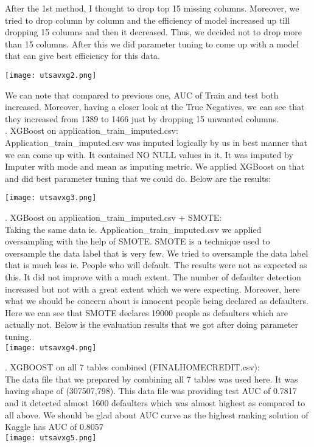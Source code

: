 \documentclass[fleqn,10pt]{SelfArx} %
\begin{document}
\begin{itemize}
\noindent
After the 1st method, I thought to drop top 15 missing columns. Moreover, we tried to drop column by column and the efficiency of model increased up till dropping 15 columns and then it decreased. Thus, we decided not to drop more than 15 columns.
After this we did parameter tuning to come up with a model that can give best efficiency for this data. 

\texttt{[image: utsavxg2.png]}
\label{fig:results}

\noindent
We can note that compared to previous one, AUC of Train and test both increased. Moreover, having a closer look at the True Negatives, we can see that they increased from 1389 to 1466 just by dropping 15 unwanted columns.\\

.	XGBoost on application_train_imputed.csv:\\
\bigbreak
\noindent
Application_train_imputed.csv was imputed logically by us in best manner that we can come up with. It contained NO NULL values in it. It was imputed by Imputer with mode and mean as imputing metric. We applied XGBoost on that and did best parameter tuning that we could do. Below are the results:

\texttt{[image: utsavxg3.png]}
\label{fig:results}

.	XGBoost on application_train_imputed.csv + SMOTE:\\
\noindent
Taking the same data ie. Application_train_imputed.csv we applied oversampling with the help of SMOTE. SMOTE is a technique used to oversample the data label that is very few. We tried to oversample the data label that is much less ie. People who will default. The results were not as expected as this. It did not improve with a much extent. The number of defaulter detection increased but not with a great extent which we were expecting. Moreover, here what we should be concern about is innocent people being declared as defaulters. Here we can see that SMOTE declares 19000 people as defaulters which are actually not.  Below is the evaluation results that we got after doing parameter tuning. \\

\texttt{[image: utsavxg4.png]}
\label{fig:results}

.	XGBOOST on all 7 tables combined 
(FINALHOMECREDIT.csv):\\
\noindent
The data file that we prepared by combining all 7 tables was used here. It was having shape of (307507,798). This data file was providing test AUC of 0.7817 and it detected almost 1600 defaulters which was almost highest as compared to all above. We should be glad about AUC curve as  the highest ranking solution of Kaggle has AUC of 0.8057\\
\texttt{[image: utsavxg5.png]}
\label{fig:results}


\end{itemize}
\end{document}

